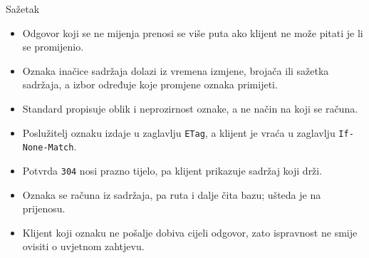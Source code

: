 \begin{frame}{Sažetak}
\begin{itemize}
  \itemsep0.3em
  \item Odgovor koji se ne mijenja prenosi se više puta ako klijent ne može pitati je li se promijenio.
  \item Oznaka inačice sadržaja dolazi iz vremena izmjene, brojača ili sažetka sadržaja, a izbor određuje koje promjene oznaka primijeti.
  \item Standard propisuje oblik i neprozirnost oznake, a ne način na koji se računa.
  \item Poslužitelj oznaku izdaje u zaglavlju \texttt{ETag}, a klijent je vraća u zaglavlju \texttt{If-None-Match}.
  \item Potvrda \texttt{304} nosi prazno tijelo, pa klijent prikazuje sadržaj koji drži.
  \item Oznaka se računa iz sadržaja, pa ruta i dalje čita bazu; ušteda je na prijenosu.
  \item Klijent koji oznaku ne pošalje dobiva cijeli odgovor, zato ispravnost ne smije ovisiti o uvjetnom zahtjevu.
\end{itemize}
\end{frame}


